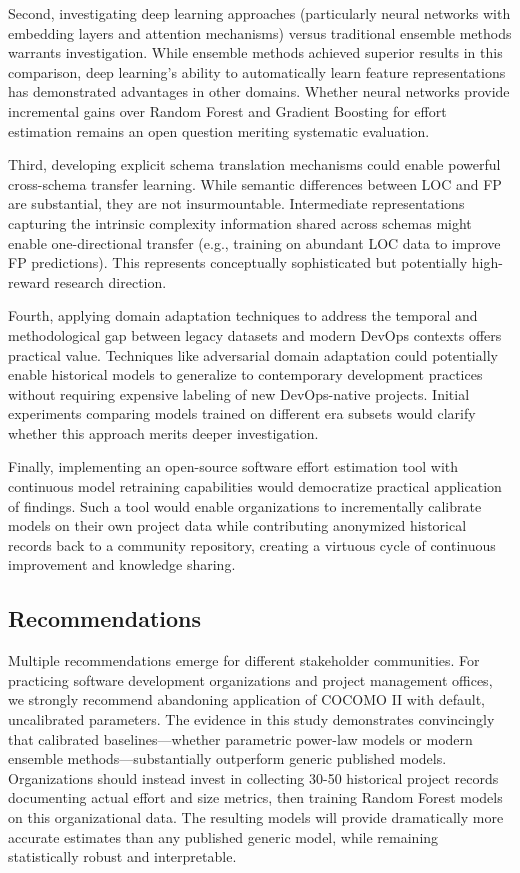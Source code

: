 \documentclass[11pt,a4paper]{article}
\begin{document}
Second, investigating deep learning approaches (particularly neural networks with embedding layers and attention mechanisms) versus traditional ensemble methods warrants investigation. While ensemble methods achieved superior results in this comparison, deep learning's ability to automatically learn feature representations has demonstrated advantages in other domains. Whether neural networks provide incremental gains over Random Forest and Gradient Boosting for effort estimation remains an open question meriting systematic evaluation.

Third, developing explicit schema translation mechanisms could enable powerful cross-schema transfer learning. While semantic differences between LOC and FP are substantial, they are not insurmountable. Intermediate representations capturing the intrinsic complexity information shared across schemas might enable one-directional transfer (e.g., training on abundant LOC data to improve FP predictions). This represents conceptually sophisticated but potentially high-reward research direction.

Fourth, applying domain adaptation techniques to address the temporal and methodological gap between legacy datasets and modern DevOps contexts offers practical value. Techniques like adversarial domain adaptation could potentially enable historical models to generalize to contemporary development practices without requiring expensive labeling of new DevOps-native projects. Initial experiments comparing models trained on different era subsets would clarify whether this approach merits deeper investigation.

Finally, implementing an open-source software effort estimation tool with continuous model retraining capabilities would democratize practical application of findings. Such a tool would enable organizations to incrementally calibrate models on their own project data while contributing anonymized historical records back to a community repository, creating a virtuous cycle of continuous improvement and knowledge sharing.

\subsection{Recommendations}

Multiple recommendations emerge for different stakeholder communities. For practicing software development organizations and project management offices, we strongly recommend abandoning application of COCOMO II with default, uncalibrated parameters. The evidence in this study demonstrates convincingly that calibrated baselines---whether parametric power-law models or modern ensemble methods---substantially outperform generic published models. Organizations should instead invest in collecting 30-50 historical project records documenting actual effort and size metrics, then training Random Forest models on this organizational data. The resulting models will provide dramatically more accurate estimates than any published generic model, while remaining statistically robust and interpretable.
\end{document}
